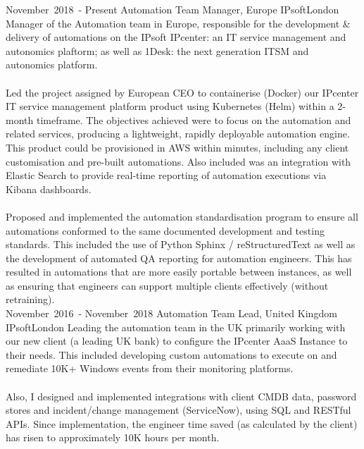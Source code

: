 
\edef\hc{\string:}

\cventry %
  {\mbox{November 2018 -} \mbox{Present}}
  {Automation Team Manager, Europe}
  {IPsoft}{London}{}
  { 
    Manager of the Automation team in Europe, responsible for the 
    development \& delivery of automations on the IPsoft IPcenter: an IT service management 
    and autonomics plaftorm; as well as 1Desk: the next generation ITSM and autonomics platform.\\~\\
    Led the project assigned by European CEO to containerise (Docker) our IPcenter 
    IT service management platform product using Kubernetes (Helm) within a 2-month timeframe. 
    The objectives achieved were to focus on the automation and related services, 
    producing a lightweight, rapidly deployable automation engine. 
    This product could be provisioned in AWS within minutes, including any client 
    customisation and pre-built automations. 
    Also included was an integration with Elastic Search to provide real-time 
    reporting of automation executions via Kibana dashboards.\\~\\
    Proposed and implemented the automation standardisation program to ensure all 
    automations conformed to the same documented development and testing standards. 
    This included the use of Python Sphinx / reStructuredText as well as the development 
    of automated QA reporting for automation engineers. 
    This has resulted in automations that are more easily portable between instances, 
    as well as ensuring that engineers can support multiple clients effectively (without retraining).\\ 
  }
\cventry %
  {\mbox{November 2016 -} \mbox{November 2018}}
  {Automation Team Lead, United Kingdom}
  {IPsoft}{London}{}
  {
    Leading the automation team in the UK primarily working with our new client (a leading UK bank) to 
    configure the IPcenter AaaS Instance to their needs. This included developing custom 
    automations to execute on and remediate 10K+ Windows events from their monitoring platforms.\\~\\ 
    Also, I designed and implemented integrations with client CMDB data, password stores 
    and incident/change management (ServiceNow), using SQL and RESTful APIs. Since 
    implementation, the engineer time saved (as calculated by the client) has risen to approximately 
    10K hours per month.\\
  }

